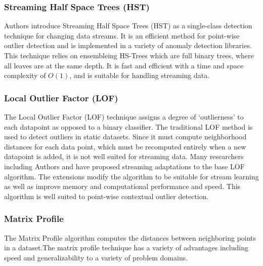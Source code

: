 \subsubsection{Streaming Half Space Trees (HST)}
Authors \cite{fast-anomaly-detection-streaming} introduce Streaming Half Space Trees (HST) as a single-class detection technique for changing data streams. It is an efficient method for point-wise outlier detection and is implemented in a variety of anomaly detection libraries. This technique relies on ensembleing HS-Trees which are full binary trees, where all leaves are at the same depth. It is fast and efficient with a time and space complexity of $O(1)$, and is suitable for handling streaming data.



\subsubsection{Local Outlier Factor (LOF)}

The Local Outlier Factor (LOF) technique assigns a degree of `outlierness' to each datapoint as opposed to a binary classifier. The traditional LOF method is used to detect outliers in static datasets. Since it must compute neighborhood distances for each data point, which must be recomputed entirely when a new datapoint is added, it is not well suited for streaming data. Many researchers including Authors \cite{dilof-data-streams} and \cite{fast-memory-efficent-lof-milof} have proposed streaming adaptations to the base LOF algorithm. The extensions modify the algorithm to be suitable for stream learning as well as improve memory and computational performance and speed. This algorithm is well suited to point-wise contextual outlier detection.

\subsubsection{Matrix Profile} %
\label{ref_matrix-profile-alg}
The Matrix Profile algorithm computes the distances between neighboring points in a dataset.The matrix profile technique has a variety of advantages including speed and generalizability to a variety of problem domains.


